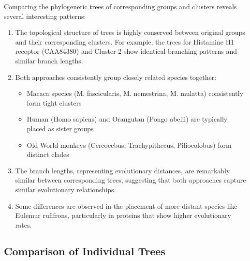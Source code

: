 \documentclass[11pt, a4paper, hidelinks]{article}
\begin{document}
Comparing the phylogenetic trees of corresponding groups and clusters reveals several interesting patterns:

\begin{enumerate}
    \item The topological structure of trees is highly conserved between original groups and their corresponding clusters. For example, the trees for Histamine H1 receptor (CAA84380) and Cluster 2 show identical branching patterns and similar branch lengths.

    \item
        Both approaches consistently group closely related species together:
        \begin{itemize}
            \item Macaca species (M. fascicularis, M. nemestrina, M. mulatta) consistently form tight clusters
            \item Human (Homo sapiens) and Orangutan (Pongo abelii) are typically placed as sister groups
            \item Old World monkeys (Cercocebus, Trachypithecus, Piliocolobus) form distinct clades
        \end{itemize}

    \item The branch lengths, representing evolutionary distances, are remarkably similar between corresponding trees, suggesting that both approaches capture similar evolutionary relationships.

    \item Some differences are observed in the placement of more distant species like Eulemur rufifrons, particularly in proteins that show higher evolutionary rates.
\end{enumerate}

\subsection{Comparison of Individual Trees}\label{subsec:comparison-of-individual-trees}
\end{document}
